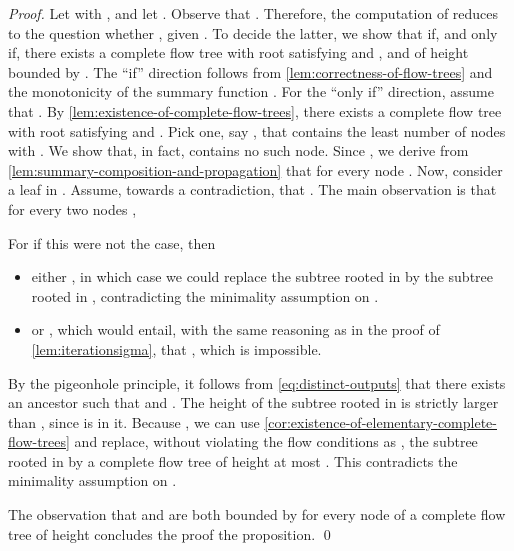 \computablesummaryfinitedispl*
\begin{proof}
  Let  with ,
  and let .
  Observe that .
  Therefore,
  the computation of  reduces to the
  question whether ,
  given .
  To decide the latter,
  we show that  if, and only if,
  there exists a complete flow tree with root
   satisfying  and ,
  and of height bounded by .
  The ``if'' direction follows from \cref{lem:correctness-of-flow-trees}
  and the monotonicity of the summary function .
  For the ``only if'' direction,
  assume that .
  By \cref{lem:existence-of-complete-flow-trees},
  there exists a complete flow tree with
  root  satisfying  and .
  Pick one,
  say ,
  that contains the least number of nodes  with .
  We show that, in fact,  contains no such node.
  Since ,
  we derive from \cref{lem:summary-composition-and-propagation} that
   for every node .
  Now,
  consider a leaf  in .
  Assume, towards a contradiction, that .
  The main observation is that for every two nodes ,

For if this were not the case,
  then
  \begin{itemize}
  \item
    either ,
    in which case we could replace the subtree rooted in 
    by the subtree rooted in ,
    contradicting the minimality assumption on .
  \item
    or  ,
    which would entail,
    with the same reasoning as in the proof of \cref{lem:iterationsigma},
    that ,
    which is impossible.
  \end{itemize}
By the pigeonhole principle,
  it follows from \cref{eq:distinct-outputs} that
  there exists an ancestor 
  such that  and
  .
  The height of the subtree rooted in  is strictly larger than ,
  since  is in it.
  Because ,
  we can use \cref{cor:existence-of-elementary-complete-flow-trees}
  and replace,
  without violating the flow conditions as ,
  the subtree rooted in  by a complete flow tree of
  height at most .
  This contradicts the minimality assumption on .

  \medskip

  The observation that  and  are both bounded by
 for every node  of a complete flow tree of height 
  concludes the proof the proposition.
  \qed
\end{proof}

